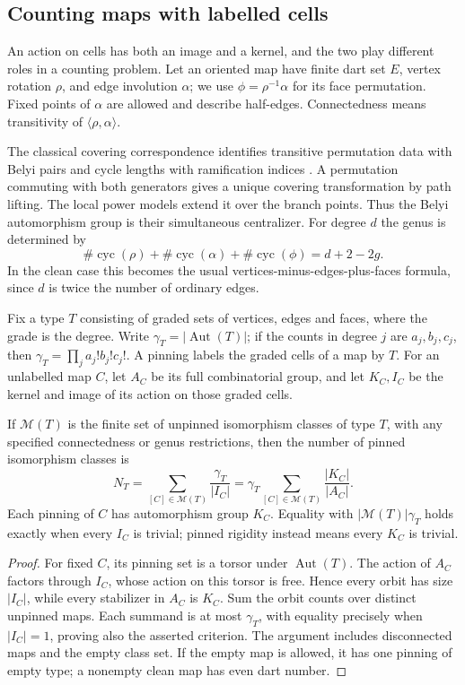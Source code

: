 \subsection{Counting maps with labelled cells}\label{sec:pinned-count}
An action on cells has both an image and a kernel, and the two play
different roles in a counting problem. Let an oriented map have finite
dart set $E$, vertex rotation $\rho$, and edge involution $\alpha$;
we use $\phi=\rho^{-1}\alpha$ for its face permutation. Fixed points
of $\alpha$ are allowed and describe half-edges. Connectedness means
transitivity of $\langle\rho,\alpha\rangle$.

The classical covering correspondence identifies transitive permutation
data with Belyi pairs and cycle lengths with ramification indices
\cite[Lemma~I.1, p.~2, and Theorem~I.5, p.~8]{Schneps}. A permutation
commuting with both generators gives a unique covering transformation
by path lifting. The local power models extend it over the branch
points. Thus the Belyi automorphism group is their simultaneous
centralizer. For degree $d$ the genus is determined by
\[
 \#\operatorname{cyc}(\rho)+\#\operatorname{cyc}(\alpha)
 +\#\operatorname{cyc}(\phi)=d+2-2g.
\]
In the clean case this becomes the usual vertices-minus-edges-plus-faces
formula, since $d$ is twice the number of ordinary edges.

Fix a type $T$ consisting of graded sets of vertices, edges and faces,
where the grade is the degree. Write
$\gamma_T=|\operatorname{Aut}(T)|$; if the counts in degree $j$ are
$a_j,b_j,c_j$, then $\gamma_T=\prod_j a_j!b_j!c_j!$.
A pinning labels the graded cells of a map by $T$. For an unlabelled
map $C$, let $A_C$ be its full combinatorial group, and let $K_C,I_C$
be the kernel and image of its action on those graded cells.

\begin{proposition}\label{prop:pinning-count}
If $\mathcal M(T)$ is the finite set of unpinned isomorphism classes
of type $T$, with any specified connectedness or genus restrictions,
then the number of pinned isomorphism classes is
\[
 N_T=\sum_{[C]\in\mathcal M(T)}\frac{\gamma_T}{|I_C|}
 =\gamma_T\sum_{[C]\in\mathcal M(T)}\frac{|K_C|}{|A_C|}.
\]
Each pinning of $C$ has automorphism group $K_C$. Equality with
$|\mathcal M(T)|\gamma_T$ holds exactly when every $I_C$ is trivial;
pinned rigidity instead means every $K_C$ is trivial.
\end{proposition}
\begin{proof}
For fixed $C$, its pinning set is a torsor under $\operatorname{Aut}(T)$.
The action of $A_C$ factors through $I_C$, whose action on this torsor
is free. Hence every orbit has size $|I_C|$, while every stabilizer
in $A_C$ is $K_C$. Sum the orbit counts over distinct unpinned maps.
Each summand is at most $\gamma_T$, with equality precisely when
$|I_C|=1$, proving also the asserted criterion. The argument includes
disconnected maps and the empty class set. If the empty map is allowed,
it has one pinning of empty type; a nonempty clean map has even dart
number.
\end{proof}

